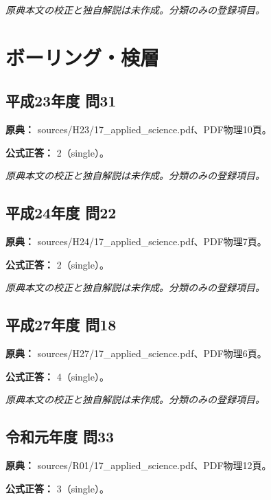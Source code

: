 \par\textit{原典本文の校正と独自解説は未作成。分類のみの登録項目。}

\section{ボーリング・検層}

\subsection{平成23年度 問31}
\label{q:h23-reg-applied-31}

\noindent\textbf{原典：} sources/H23/17\_applied\_science.pdf、PDF物理10頁。

\textbf{公式正答：} 2（single）。

\par\textit{原典本文の校正と独自解説は未作成。分類のみの登録項目。}

\subsection{平成24年度 問22}
\label{q:h24-reg-applied-22}

\noindent\textbf{原典：} sources/H24/17\_applied\_science.pdf、PDF物理7頁。

\textbf{公式正答：} 2（single）。

\par\textit{原典本文の校正と独自解説は未作成。分類のみの登録項目。}

\subsection{平成27年度 問18}
\label{q:h27-reg-applied-18}

\noindent\textbf{原典：} sources/H27/17\_applied\_science.pdf、PDF物理6頁。

\textbf{公式正答：} 4（single）。

\par\textit{原典本文の校正と独自解説は未作成。分類のみの登録項目。}

\subsection{令和元年度 問33}
\label{q:r01-reg-applied-33}

\noindent\textbf{原典：} sources/R01/17\_applied\_science.pdf、PDF物理12頁。

\textbf{公式正答：} 3（single）。

